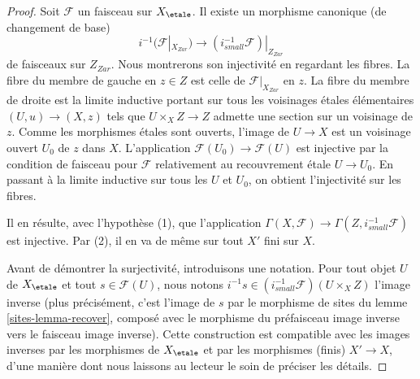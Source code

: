 \begin{proof}
Soit $\mathcal{F}$ un faisceau sur $X_\etale$. Il existe un morphisme canonique
(de changement de base)
$$
i^{-1}(\mathcal{F}|_{X_{Zar}})
\longrightarrow
(i_{small}^{-1}\mathcal{F})|_{Z_{Zar}}
$$
de faisceaux sur $Z_{Zar}$. Nous montrerons son injectivité en regardant
les fibres. La fibre du membre de gauche en $z \in Z$
est celle de $\mathcal{F}|_{X_{Zar}}$ en $z$. La fibre du membre de droite
est la limite inductive portant sur tous les voisinages étales élémentaires
$(U, u) \to (X, z)$ tels que $U \times_X Z \to Z$ admette une section sur
un voisinage de $z$. Comme les morphismes étales sont ouverts, l'image de
$U \to X$ est un voisinage ouvert $U_0$ de $z$ dans $X$. L'application
$\mathcal{F}(U_0) \to \mathcal{F}(U)$ est injective par la condition de faisceau
pour $\mathcal{F}$ relativement au recouvrement étale $U \to U_0$.
En passant à la limite inductive sur tous les $U$ et $U_0$, on obtient l'injectivité sur les fibres.

\medskip\noindent
Il en résulte, avec l'hypothèse (1), que l'application
$\Gamma(X, \mathcal{F}) \to \Gamma(Z, i^{-1}_{small}\mathcal{F})$
est injective. Par (2), il en va de même sur tout $X'$ fini sur $X$.

\medskip\noindent
Avant de démontrer la surjectivité, introduisons une notation. Pour
tout objet $U$ de $X_\etale$ et tout $s \in \mathcal{F}(U)$, nous
notons $i^{-1}s \in (i_{small}^{-1}\mathcal{F})(U \times_X Z)$
l'image inverse (plus précisément, c'est l'image de $s$ par le morphisme
de sites du lemme \ref{sites-lemma-recover}, composé avec le morphisme du
préfaisceau image inverse vers le faisceau image inverse). Cette construction est
compatible avec les images inverses par les morphismes de $X_\etale$ et par les morphismes (finis)
$X' \to X$, d'une manière dont nous laissons au lecteur le soin de préciser les détails.


\end{proof}
